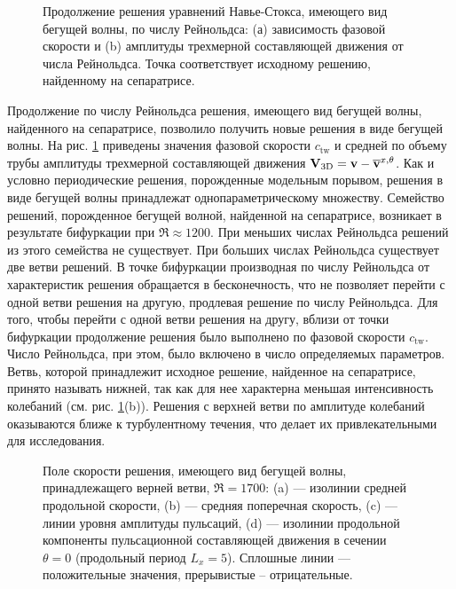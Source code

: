 \begin{figure}
\caption{Продолжение решения уравнений Навье-Стокса, имеющего вид бегущей волны, по числу Рейнольдса: (а) зависимость фазовой скорости и (b) амплитуды трехмерной составляющей движения от числа Рейнольдса. Точка соответствует исходному решению, найденному на сепаратрисе.} 
\label{pipeTW_contin_pic}
\end{figure}

Продолжение по числу Рейнольдса решения, имеющего вид бегущей волны, найденного на сепаратрисе, позволило получить новые решения в виде бегущей волны. На рис. \ref{pipeTW_contin_pic} приведены значения фазовой скорости $c_\mathrm{tw}$ и средней по объему трубы амплитуды трехмерной составляющей движения $\mathbf{V}_\mathrm{3D} = \mathbf{v} - \overline{\mathbf{v}}^{x,\theta}$. Как и условно периодические решения, порожденные модельным порывом, решения в виде бегущей волны принадлежат однопараметрическому множеству. Семейство решений, порожденное бегущей волной, найденной на сепаратрисе, возникает в результате бифуркации при $\Re \approx 1200$. При меньших числах Рейнольдса решений из этого семейства не существует. При больших числах Рейнольдса существует две ветви решений. В точке бифуркации производная по числу Рейнольдса от характеристик решения обращается в бесконечность, что не позволяет перейти с одной ветви решения на другую, продлевая решение по числу Рейнольдса. Для того, чтобы перейти с одной ветви решения на другу, вблизи от точки бифуркации продолжение решения было выполнено по фазовой скорости $c_\mathrm{tw}$. Число Рейнольдса, при этом, было включено в число определяемых параметров. Ветвь, которой принадлежит исходное решение, найденное на сепаратрисе, принято называть нижней, так как для нее характерна меньшая интенсивность колебаний (см. рис. \ref{pipeTW_contin_pic}(b)). Решения с верхней ветви по амплитуде колебаний оказываются ближе к турбулентному течения, что делает их привлекательными для исследования. 

\begin{figure}
\caption{Поле скорости решения, имеющего вид бегущей волны, принадлежащего верней ветви, $\Re = 1700$: (a) --- изолинии средней продольной скорости, (b) --- средняя поперечная скорость, (c) --- линии уровня амплитуды пульсаций, (d) --- изолинии продольной компоненты пульсационной составляющей движения в сечении $\theta = 0$ (продольный период $L_x = 5$). Сплошные линии --- положительные значения, прерывистые -- отрицательные. } 
\label{pipeTWub_means_pic}
\end{figure}

